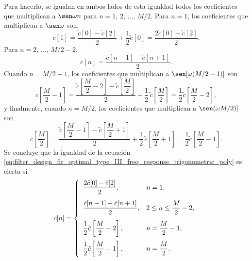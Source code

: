\documentclass[a4paper]{report}
\begin{document}
Para hacerlo, se igualan en ambos lados de esta igualdad todos los coeficientes que multiplican a \(\sen\omega n\) para \(n=1,\,2,\,\dots,\,M/2\). Para \(n=1\), los coeficientes que multiplican a \(\sen\omega\) son,
\[
 c[1]=\frac{\tilde{c}[0]-\tilde{c}[2]}{2}+\frac{1}{2}\tilde{c}[0]=\frac{2\tilde{c}[0]-\tilde{c}[2]}{2}.
\]
Para \(n=2,\,\dots,\,M/2-2\),
\[
 c[n]=\frac{\tilde{c}[n-1]-\tilde{c}[n+1]}{2}.
\]
Cuando \(n=M/2-1\), los coeficientes  que multiplican a \(\sen[\omega(M/2-1)]\) son
\[
 c\left[\frac{M}{2}-1\right]=\dfrac{\tilde{c}\left[\dfrac{M}{2}-2\right]-\tilde{c}\left[\dfrac{M}{2}\right]}{2}+\frac{1}{2}\,\tilde{c}\left[\frac{M}{2}\right]=\frac{1}{2}\tilde{c}\left[\dfrac{M}{2}-2\right],
\]
y finalmente, cuando \(n=M/2\), los coeficientes  que multiplican a \(\sen(\omega M/2)]\) son
\[
 c\left[\frac{M}{2}\right]=\dfrac{\tilde{c}\left[\dfrac{M}{2}-1\right]-\tilde{c}\left[\dfrac{M}{2}+1\right]}{2}+\frac{1}{2}\,\tilde{c}\left[\frac{M}{2}+1\right]=\frac{1}{2}\tilde{c}\left[\dfrac{M}{2}-1\right].
\]
Se concluye que la igualdad de la ecuación \ref{eq:filter_design_fir_optimal_type_III_freq_response_trigonometric_poly} es cierta si
\begin{equation}\label{eq:filter_design_fir_optimal_type_III_freq_response_trigonometric_poly_bn}
 c[n]=\left\{ 
 \begin{array}{ll}
  \dfrac{2\tilde{c}[0]-\tilde{c}[2]}{2},& n=1,\\[\bigskipamount]
  \dfrac{\tilde{c}[n-1]-\tilde{c}[n+1]}{2},& 2\leq n\leq\dfrac{M}{2}-2,\\[\bigskipamount]
  \dfrac{1}{2}\tilde{c}\left[\dfrac{M}{2}-2\right], & n=\dfrac{M}{2}-1,\\[\bigskipamount]
  \dfrac{1}{2}\tilde{c}\left[\dfrac{M}{2}-1\right], & n=\dfrac{M}{2}.
 \end{array}
 \right.
\end{equation}
\end{document}
